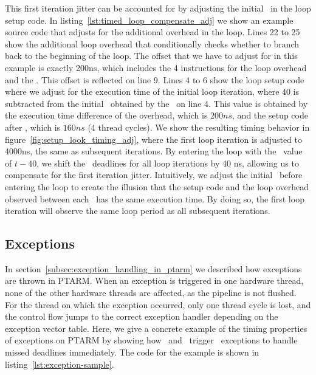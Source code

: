 This first iteration jitter can be accounted for by adjusting the initial \deadlinet\ in the loop setup code.
In listing~\ref{lst:timed_loop_compensate_adj} we show an example source code that adjusts for the additional overhead in the loop.
Lines 22 to 25 show the additional loop overhead that conditionally checks whether to branch back to the beginning of the loop.
The offset that we have to adjust for in this example is exactly 200ns, which includes the 4 instructions for the loop overhead and the \delayuntil. 
This offset is reflected on line 9.
Lines 4 to 6 show the loop setup code where we adjust for the execution time of the initial loop iteration, where 40 is subtracted from the initial \deadlinet\ obtained by the \gettime\ on line 4.
This value is obtained by the execution time difference of the overhead, which is $200ns$, and the setup code after \gettime, which is $160 ns$ (4 thread cycles).
We show the resulting timing behavior in figure~\ref{fig:setup_look_timing_adj}, where the first loop iteration is adjusted to 4000ns, the same as subsequent iterations.
By entering the loop with the \deadlinet\ value of $t-40$, we shift the \delayuntil\ deadlines for all loop iterations by 40 ns, allowing us to compensate for the first iteration jitter.   
Intuitively, we adjust the initial \deadlinet\ before entering the loop to create the illusion that the setup code and the loop overhead observed between each \delayuntil\ has the same execution time.
By doing so, the first loop iteration will observe the same loop period as all subsequent iterations. 

\subsection{Exceptions}
In section~\ref{subsec:exception_handling_in_ptarm} we described how exceptions are thrown in PTARM.
When an exception is triggered in one hardware thread, none of the other hardware threads are affected, as the pipeline is not flushed.
For the thread on which the exception occurred, only one thread cycle is lost, and the control flow jumps to the correct exception handler depending on the exception vector table.    
Here, we give a concrete example of the timing properties of exceptions on PTARM by showing how \exceptiononexpire\ and \deactivateexception\ trigger \timerexpired\ exceptions to handle missed deadlines immediately.
The code for the example is shown in listing~\ref{lst:exception-sample}.

